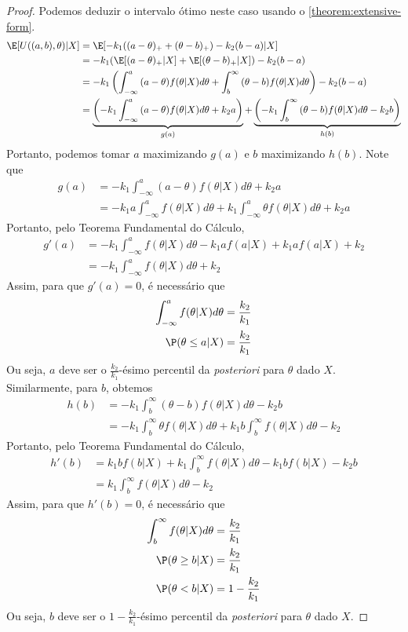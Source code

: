 \begin{proof}
 Podemos deduzir o intervalo ótimo neste caso
 usando o \cref{theorem:extensive-form}. 
 \begin{align*}
  \E[U((a,b),\theta)|X]	
  &= \E[-k_{1}((a-\theta)_{+} +(\theta-b)_{+}) 
  -k_{2}(b-a)|X] \\
  &= -k_{1}(\E[(a-\theta)_{+}|X]+\E[(\theta-b)_{+}|X]) 
  -k_{2}(b-a) \\
  &= -k_{1}\left(\int_{-\infty}^{a}{(a-\theta)f(\theta|X)d\theta}
  +\int_{b}^{\infty}{(\theta-b)f(\theta|X)d\theta}\right)
  -k_{2}(b-a) \\
  &=  \underbrace{\left(-k_{1}\int_{-\infty}^{a}{(a-\theta)f(\theta|X)d\theta}+k_{2}a\right)}_{g(a)} + \underbrace{\left(-k_{1}\int_{b}^{\infty}{(\theta-b)f(\theta|X)d\theta}-k_{2}b\right)}_{h(b)}
 \end{align*}
 Portanto, podemos tomar $a$ maximizando $g(a)$ e
 $b$ maximizando $h(b)$.
 Note que
 \begin{align*}
  g(a)	
  &= -k_{1}\int_{-\infty}^{a}{(a-\theta)f(\theta|X)d\theta}+k_{2}a \\
  &= -k_{1}a\int_{-\infty}^{a}{f(\theta|X)d\theta}+k_{1}\int_{-\infty}^{a}{\theta f(\theta|X)d\theta}+k_{2}a
 \end{align*}
 Portanto, pelo Teorema Fundamental do Cálculo,
 \begin{align*}
  g'(a)	&= -k_{1}\int_{-\infty}^{a}{f(\theta|X)d\theta} -k_{1}af(a|X) +k_{1}af(a|X) + k_{2} \\
  &= -k_{1}\int_{-\infty}^{a}{f(\theta|X)d\theta} + k_{2}
 \end{align*}
 Assim, para que $g'(a) = 0$, é necessário que
 \begin{align*}
  \int_{-\infty}^{a}{f(\theta|X)d\theta}
  &= \frac{k_{2}}{k_{1}} \\
  \P(\theta \leq a|X)
  &= \frac{k_{2}}{k_{1}}
 \end{align*}
 Ou seja, $a$ deve ser o 
 $\frac{k_2}{k_1}$-ésimo percentil da 
 \emph{posteriori} para $\theta$ dado $X$.
 Similarmente, para $b$, obtemos 
 \begin{align*}
  h(b)	
  &= -k_{1}\int_{b}^{\infty}
  {(\theta-b)f(\theta|X)d\theta}-k_{2}b	\\
  &= -k_{1}\int_{b}^{\infty}{\theta f(\theta|X)d\theta}
  +k_{1}b\int_{b}^{\infty}{f(\theta|X)d\theta} -k_{2}
 \end{align*}
 Portanto, pelo Teorema Fundamental do Cálculo,
 \begin{align*}
  h'(b)	&= k_{1}bf(b|X)+k_{1}\int_{b}^{\infty}{f(\theta|X)d\theta}-k_{1}bf(b|X) - k_{2}b \\
  &= k_{1}\int_{b}^{\infty}{f(\theta|X)d\theta} -k_{2}
 \end{align*}
 Assim, para que $h'(b) = 0$, é necessário que
 \begin{align*}
  \int_{b}^{\infty}{f(\theta|X)d\theta}
  &= \frac{k_2}{k_1} \\
  \P(\theta \geq b|X)
  &= \frac{k_2}{k_1} \\
  \P(\theta < b|X)										
  &= 1-\frac{k_2}{k_1}
 \end{align*}
 Ou seja, $b$ deve ser o 
 $1-\frac{k_2}{k_1}$-ésimo percentil da 
 \emph{posteriori} para $\theta$ dado $X$.
\end{proof}
